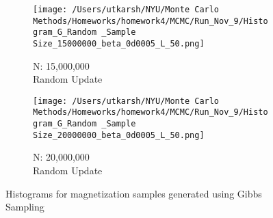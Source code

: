 \documentclass[11pt]{article}
\begin{document}
\begin{figure}[H]
\begin{subfigure}{.22\textwidth}
		\texttt{[image: /Users/utkarsh/NYU/Monte Carlo Methods/Homeworks/homework4/MCMC/Run\_Nov\_9/Histogram\_G\_Random \_Sample Size\_15000000\_beta\_0d0005\_L\_50.png]}
		\caption{N: 15,000,000\\Random Update}
	\end{subfigure}
    \begin{subfigure}{.22\textwidth}
		\texttt{[image: /Users/utkarsh/NYU/Monte Carlo Methods/Homeworks/homework4/MCMC/Run\_Nov\_9/Histogram\_G\_Random \_Sample Size\_20000000\_beta\_0d0005\_L\_50.png]}
		\caption{N: 20,000,000\\Random Update}
	\end{subfigure}
    \caption{Histograms for magnetization samples generated using Gibbs Sampling}
	\label{fig:histograms_gibbs}
\end{figure}
\end{document}
